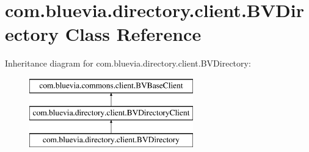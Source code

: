 \hypertarget{classcom_1_1bluevia_1_1directory_1_1client_1_1BVDirectory}{
\section{com.bluevia.directory.client.BVDirectory Class Reference}
\label{classcom_1_1bluevia_1_1directory_1_1client_1_1BVDirectory}
}
Inheritance diagram for com.bluevia.directory.client.BVDirectory:\begin{figure}[H]
\begin{center}
\leavevmode
\includegraphics[height=3.000000cm]{classcom_1_1bluevia_1_1directory_1_1client_1_1BVDirectory}
\end{center}
\end{figure}
